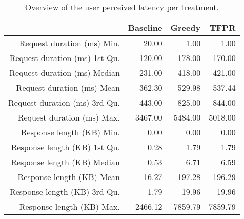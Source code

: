 \begin{table}[ht]
\centering
\begin{tabular}{rrrr}
  \hline
 & Baseline & Greedy & TFPR \\ 
  \hline
Request duration (ms) Min. & 20.00 & 1.00 & 1.00 \\ 
  Request duration (ms) 1st Qu. & 120.00 & 178.00 & 170.00 \\ 
  Request duration (ms) Median & 231.00 & 418.00 & 421.00 \\ 
  Request duration (ms) Mean & 362.30 & 529.98 & 537.44 \\ 
  Request duration (ms) 3rd Qu. & 443.00 & 825.00 & 844.00 \\ 
  Request duration (ms) Max. & 3467.00 & 5484.00 & 5018.00 \\ 
  Response length (KB) Min. & 0.00 & 0.00 & 0.00 \\ 
  Response length (KB) 1st Qu. & 0.28 & 1.79 & 1.79 \\ 
  Response length (KB) Median & 0.53 & 6.71 & 6.59 \\ 
  Response length (KB) Mean & 16.27 & 197.28 & 196.29 \\ 
  Response length (KB) 3rd Qu. & 1.79 & 19.96 & 19.96 \\ 
  Response length (KB) Max. & 2466.12 & 7859.79 & 7859.79 \\ 
   \hline
\end{tabular}
\caption{Overview of the user perceived latency per treatment.} 
\label{tab:results:rq2:summary:treatment}
\end{table}
